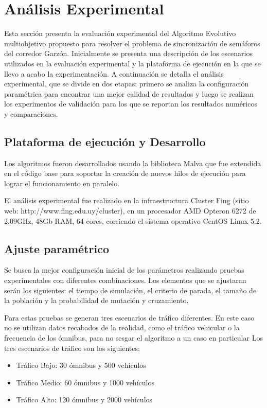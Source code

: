 \chapter{Análisis Experimental}
Esta sección presenta la evaluación experimental del Algoritmo Evolutivo multiobjetivo propuesto para resolver el problema de sincronización de semáforos del corredor Garzón. Inicialmente se presenta una descripción de los escenarios utilizados en la evaluación experimental y la plataforma de ejecución en la que se llevo a acabo la experimentación. A continuación se detalla el análisis experimental, que se divide en dos etapas: primero se analiza la configuración paramétrica para encontrar una mejor calidad de resultados y luego se realizan los experimentos de validación para los que se reportan los resultados numéricos y comparaciones.


\section{Plataforma de ejecución y Desarrollo}
Los algoritmos fueron desarrollados usando la biblioteca Malva que fue extendida en el código base para soportar la creación de nuevos hilos de ejecución para lograr el funcionamiento en paralelo.

El análisis experimental fue realizado en la infraestructura Cluster Fing (sitio web: http://www.fing.edu.uy/cluster), en un procesador AMD Opteron 6272 de 2.09GHz, 48Gb RAM, 64 cores, corriendo el sistema operativo CentOS Linux 5.2.


\section{Ajuste paramétrico}
Se busca la mejor configuración inicial de los parámetros realizando pruebas experimentales con diferentes combinaciones. Los elementos que se ajustaran serán los siguientes: el tiempo de simulación, el criterio de parada, el tamaño de la población y la probabilidad de mutación y cruzamiento.

Para estas pruebas se generan tres escenarios de tráfico diferentes. En este caso no se utilizan datos recabados de la realidad, como el tráfico vehicular o la frecuencia de los ómnibus, para no sesgar el algoritmo a un caso en particular
Los tres escenarios de tráfico son los siguientes:

\begin{itemize}
	\item Tráfico Bajo: 30 ómnibus y 500 vehículos	
	\item Tráfico Medio: 60 ómnibus y 1000 vehículos
	\item Tráfico Alto: 120 ómnibus y 2000 vehículos
\end{itemize}



